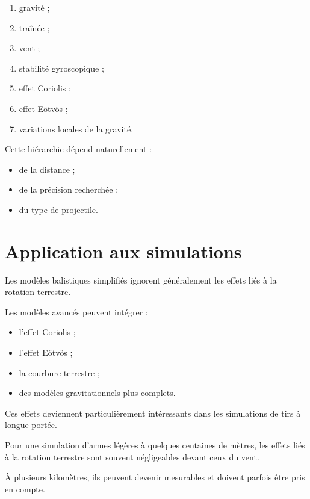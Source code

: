 \begin{enumerate}
    \item gravité ;
    \item traînée ;
    \item vent ;
    \item stabilité gyroscopique ;
    \item effet Coriolis ;
    \item effet Eötvös ;
    \item variations locales de la gravité.
\end{enumerate}

Cette hiérarchie dépend naturellement :

\begin{itemize}
    \item de la distance ;
    \item de la précision recherchée ;
    \item du type de projectile.
\end{itemize}

\section{Application aux simulations}

Les modèles balistiques simplifiés ignorent généralement les effets liés à la
rotation terrestre.

Les modèles avancés peuvent intégrer :

\begin{itemize}
    \item l'effet Coriolis ;
    \item l'effet Eötvös ;
    \item la courbure terrestre ;
    \item des modèles gravitationnels plus complets.
\end{itemize}

Ces effets deviennent particulièrement intéressants dans les simulations de
tirs à longue portée.

\begin{simulation}

Pour une simulation d'armes légères à quelques centaines de mètres, les effets
liés à la rotation terrestre sont souvent négligeables devant ceux du vent.

À plusieurs kilomètres, ils peuvent devenir mesurables et doivent parfois être
pris en compte.

\end{simulation}

